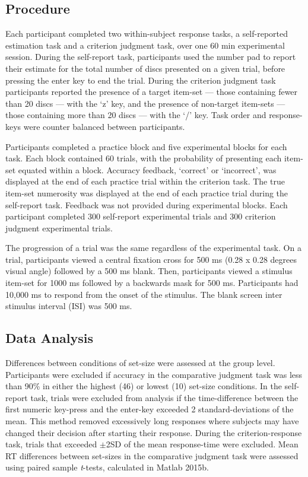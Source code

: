 \subsection{Procedure}
Each participant completed two within-subject response tasks, a self-reported estimation task and a criterion judgment task, over one 60 min experimental session. During the self-report task, participants used the number pad to report their estimate for the total number of discs presented on a given trial, before pressing the enter key to end the trial. During the criterion judgment task participants reported the presence of a target item-set --- those containing fewer than 20 discs --- with the `z' key, and the presence of non-target item-sets --- those containing more than 20 discs --- with the `/' key. Task order and response-keys were counter balanced between participants.

Participants completed a practice block and five experimental blocks for each task. Each block contained 60 trials, with the probability of presenting each item-set equated within a block. Accuracy feedback, `correct' or `incorrect', was displayed at the end of each practice trial within the criterion task. The true item-set numerosity was displayed at the end of each practice trial during the self-report task. Feedback was not provided during experimental blocks. Each participant completed 300 self-report experimental trials and 300 criterion judgment experimental trials. 

The progression of a trial was the same regardless of the experimental task. On a trial, participants viewed a central fixation cross for 500 ms (0.28 x 0.28 degrees visual angle) followed by a 500 ms blank. Then, participants viewed a stimulus item-set for 1000 ms followed by a backwards mask for 500 ms. Participants had 10,000 ms to respond from the onset of the stimulus. The blank screen inter stimulus interval (ISI) was 500 ms.

\subsection{Data Analysis}
Differences between conditions of set-size were assessed at the group level. Participants were excluded if accuracy in the comparative judgment task was less than 90\% in either the highest (46) or lowest (10) set-size conditions. In the self-report task, trials were excluded from analysis if the time-difference between the first numeric key-press and the enter-key exceeded 2 standard-deviations of the mean. This method removed excessively long responses where subjects may have changed their decision after starting their response. During the criterion-response task, trials that exceeded $\pm$2SD of the mean response-time were excluded. Mean RT differences between set-sizes in the comparative judgment task were assessed using paired sample \textit{t}-tests, calculated in Matlab 2015b.

